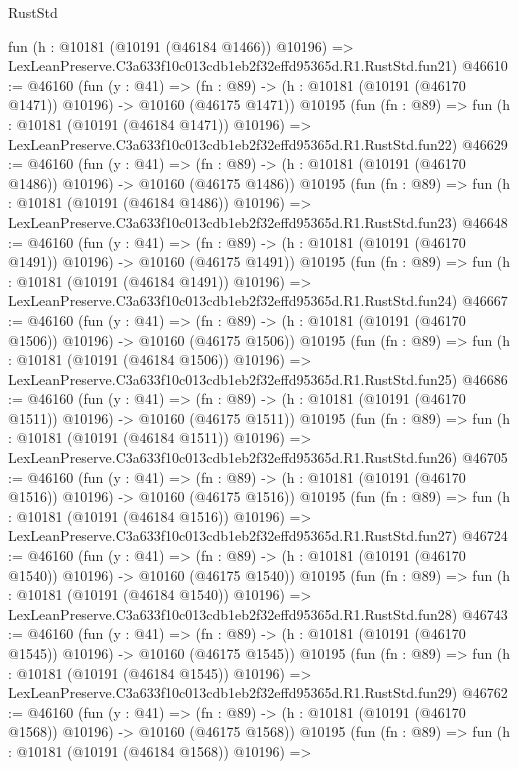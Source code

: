 \begin{lexlean}{RustStd}
\begin{coremodule}
    fun (h : @10181 (@10191 (@46184 @1466)) @10196) =>
    LexLeanPreserve.C3a633f10c013cdb1eb2f32effd95365d.R1.RustStd.fun21)
@46610 := @46160
    (fun (y : @41) =>
    (fn : @89) -> (h : @10181 (@10191 (@46170 @1471)) @10196) -> @10160 (@46175 @1471))
    @10195
    (fun (fn : @89) =>
    fun (h : @10181 (@10191 (@46184 @1471)) @10196) =>
    LexLeanPreserve.C3a633f10c013cdb1eb2f32effd95365d.R1.RustStd.fun22)
@46629 := @46160
    (fun (y : @41) =>
    (fn : @89) -> (h : @10181 (@10191 (@46170 @1486)) @10196) -> @10160 (@46175 @1486))
    @10195
    (fun (fn : @89) =>
    fun (h : @10181 (@10191 (@46184 @1486)) @10196) =>
    LexLeanPreserve.C3a633f10c013cdb1eb2f32effd95365d.R1.RustStd.fun23)
@46648 := @46160
    (fun (y : @41) =>
    (fn : @89) -> (h : @10181 (@10191 (@46170 @1491)) @10196) -> @10160 (@46175 @1491))
    @10195
    (fun (fn : @89) =>
    fun (h : @10181 (@10191 (@46184 @1491)) @10196) =>
    LexLeanPreserve.C3a633f10c013cdb1eb2f32effd95365d.R1.RustStd.fun24)
@46667 := @46160
    (fun (y : @41) =>
    (fn : @89) -> (h : @10181 (@10191 (@46170 @1506)) @10196) -> @10160 (@46175 @1506))
    @10195
    (fun (fn : @89) =>
    fun (h : @10181 (@10191 (@46184 @1506)) @10196) =>
    LexLeanPreserve.C3a633f10c013cdb1eb2f32effd95365d.R1.RustStd.fun25)
@46686 := @46160
    (fun (y : @41) =>
    (fn : @89) -> (h : @10181 (@10191 (@46170 @1511)) @10196) -> @10160 (@46175 @1511))
    @10195
    (fun (fn : @89) =>
    fun (h : @10181 (@10191 (@46184 @1511)) @10196) =>
    LexLeanPreserve.C3a633f10c013cdb1eb2f32effd95365d.R1.RustStd.fun26)
@46705 := @46160
    (fun (y : @41) =>
    (fn : @89) -> (h : @10181 (@10191 (@46170 @1516)) @10196) -> @10160 (@46175 @1516))
    @10195
    (fun (fn : @89) =>
    fun (h : @10181 (@10191 (@46184 @1516)) @10196) =>
    LexLeanPreserve.C3a633f10c013cdb1eb2f32effd95365d.R1.RustStd.fun27)
@46724 := @46160
    (fun (y : @41) =>
    (fn : @89) -> (h : @10181 (@10191 (@46170 @1540)) @10196) -> @10160 (@46175 @1540))
    @10195
    (fun (fn : @89) =>
    fun (h : @10181 (@10191 (@46184 @1540)) @10196) =>
    LexLeanPreserve.C3a633f10c013cdb1eb2f32effd95365d.R1.RustStd.fun28)
@46743 := @46160
    (fun (y : @41) =>
    (fn : @89) -> (h : @10181 (@10191 (@46170 @1545)) @10196) -> @10160 (@46175 @1545))
    @10195
    (fun (fn : @89) =>
    fun (h : @10181 (@10191 (@46184 @1545)) @10196) =>
    LexLeanPreserve.C3a633f10c013cdb1eb2f32effd95365d.R1.RustStd.fun29)
@46762 := @46160
    (fun (y : @41) =>
    (fn : @89) -> (h : @10181 (@10191 (@46170 @1568)) @10196) -> @10160 (@46175 @1568))
    @10195
    (fun (fn : @89) =>
    fun (h : @10181 (@10191 (@46184 @1568)) @10196) =>

\end{coremodule}
\end{lexlean}
